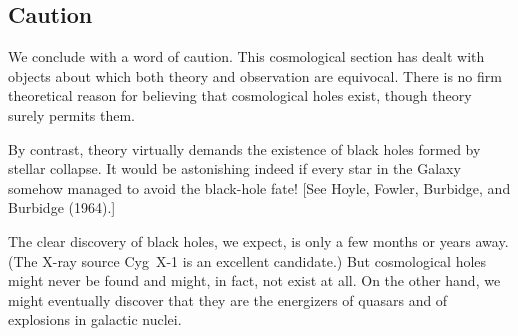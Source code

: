 
\subsection{Caution}
\label{sec:6.4}

We conclude with a word of caution.  This cosmological section has dealt with
objects about which both theory and observation are equivocal.  There is no firm
theoretical reason for believing that cosmological holes exist, though theory
surely permits them.

By contrast, theory virtually demands the existence of black holes formed
by stellar collapse.  It would be astonishing indeed if every star in the Galaxy
somehow managed to avoid the black-hole fate!  [See Hoyle, Fowler, Burbidge,
and Burbidge (1964).]

The clear discovery of black holes, we expect, is only a few months or years
away.  (The X-ray source Cyg~X-1 is an excellent candidate.)  But cosmological
holes might never be found and might, in fact, not exist at all.  On the other
hand, we might eventually discover that they are the energizers of quasars and
of explosions in galactic nuclei.
